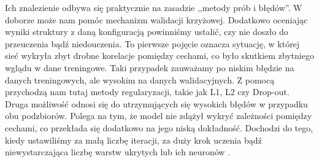 Ich znalezienie odbywa się praktycznie na zasadzie ,,metody prób i błędów''. W doborze może nam pomóc mechanizm walidacji krzyżowej. Dodatkowo oceniając wyniki struktury z daną konfiguracją powinniśmy ustalić, czy nie doszło do przeuczenia bądź niedouczenia. To pierwsze pojęcie oznacza sytuację, w której sieć wykryła zbyt drobne korelacje pomiędzy cechami, co było skutkiem zbytniego wglądu w dane treningowe. Taki przypadek zauważamy po niskim błędzie na danych treningowych, ale wysokim na danych walidacyjnych. Z pomocą przychodzą nam tutaj metody regularyzacji, takie jak L1, L2 czy Drop-out. Druga możliwość odnosi się do utrzymujących się wysokich błędów w przypadku obu podzbiorów. Polega na tym, że model nie zdążył wykryć zależności pomiędzy cechami, co przekłada się dodatkowo na jego niską dokładność. Dochodzi do tego, kiedy ustawiliśmy za małą liczbę iteracji, za duży krok uczenia bądź niewystarczająca liczbę warstw ukrytych lub ich neuronów \cite{dnn_osowski, haykin2009neural, mlpc_documentation}. 

